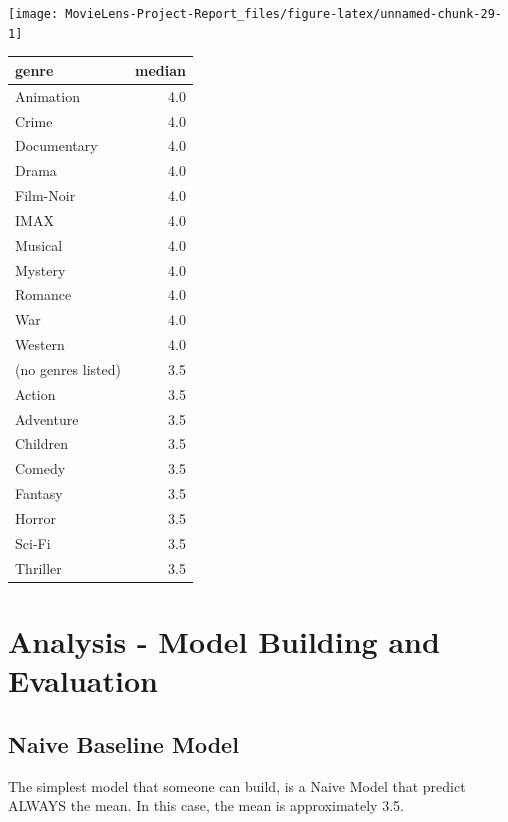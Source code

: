 \documentclass[
]{article}
\begin{document}
\begin{center}\texttt{[image: MovieLens-Project-Report\_files/figure-latex/unnamed-chunk-29-1]} \end{center}

\begin{table}
\centering\begingroup\fontsize{10}{12}\selectfont

\begin{tabular}{l|r}
\hline
genre & median\\
\hline
Animation & 4.0\\
\hline
Crime & 4.0\\
\hline
Documentary & 4.0\\
\hline
Drama & 4.0\\
\hline
Film-Noir & 4.0\\
\hline
IMAX & 4.0\\
\hline
Musical & 4.0\\
\hline
Mystery & 4.0\\
\hline
Romance & 4.0\\
\hline
War & 4.0\\
\hline
Western & 4.0\\
\hline
(no genres listed) & 3.5\\
\hline
Action & 3.5\\
\hline
Adventure & 3.5\\
\hline
Children & 3.5\\
\hline
Comedy & 3.5\\
\hline
Fantasy & 3.5\\
\hline
Horror & 3.5\\
\hline
Sci-Fi & 3.5\\
\hline
Thriller & 3.5\\
\hline
\end{tabular}
\endgroup{}
\end{table}

\hypertarget{analysis---model-building-and-evaluation}{%
\section{Analysis - Model Building and
Evaluation}\label{analysis---model-building-and-evaluation}}

\hypertarget{naive-baseline-model}{%
\subsection{Naive Baseline Model}\label{naive-baseline-model}}

The simplest model that someone can build, is a Naive Model that predict
ALWAYS the mean. In this case, the mean is approximately 3.5.
\end{document}
